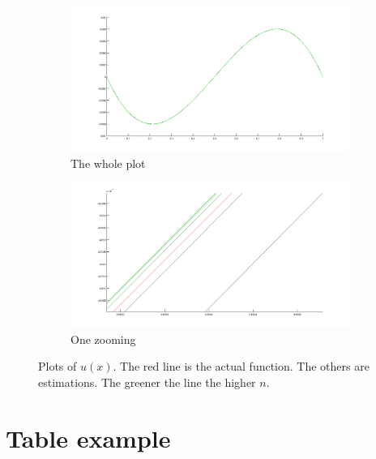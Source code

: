 \documentclass[a4paper,11pt]{article}
\begin{document}
\begin{figure}
        \begin{subfigure}[b]{1.0\textwidth}
          \includegraphics[width=\textwidth]{fig/all.png}
          \caption{The whole plot}\label{fig:wholeplot}
        \end{subfigure}

        \begin{subfigure}[b]{1.0\textwidth}
          \includegraphics[width=\textwidth]{fig/azoom.png}
          \caption{One zooming}\label{fig:zooming}
        \end{subfigure}
        \caption{Plots of $u(x)$. The red line is the actual function.
        The others are estimations. The greener the line the higher
      $n$.}\label{fig:plots}
\end{figure}


\section{Table example}
\end{document}
